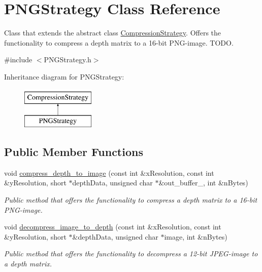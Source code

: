 \hypertarget{class_p_n_g_strategy}{\section{P\+N\+G\+Strategy Class Reference}
\label{class_p_n_g_strategy}
}


Class that extends the abstract class \hyperlink{class_compression_strategy}{Compression\+Strategy}. Offers the functionality to compress a depth matrix to a 16-\/bit P\+N\+G-\/image. T\+O\+D\+O.  




{\ttfamily \#include $<$P\+N\+G\+Strategy.\+h$>$}

Inheritance diagram for P\+N\+G\+Strategy\+:\begin{figure}[H]
\begin{center}
\leavevmode
\includegraphics[height=2.000000cm]{class_p_n_g_strategy}
\end{center}
\end{figure}
\subsection*{Public Member Functions}
\begin{DoxyCompactItemize}
\item 
void \hyperlink{class_p_n_g_strategy_aaa542a51c70ede4b82facb66d9ff9ec2}{compress\+\_\+depth\+\_\+to\+\_\+image} (const int \&x\+Resolution, const int \&y\+Resolution, short $\ast$depth\+Data, unsigned char $\ast$\&out\+\_\+buffer\+\_\+, int \&n\+Bytes)
\begin{DoxyCompactList}\small\item\em Public method that offers the functionality to compress a depth matrix to a 16-\/bit P\+N\+G-\/image. \end{DoxyCompactList}\item 
void \hyperlink{class_p_n_g_strategy_a170b89ef5e216f9166d80916d3efe1b0}{decompress\+\_\+image\+\_\+to\+\_\+depth} (const int \&x\+Resolution, const int \&y\+Resolution, short $\ast$\&depth\+Data, unsigned char $\ast$image, int \&n\+Bytes)
\begin{DoxyCompactList}\small\item\em Public method that offers the functionality to decompress a 12-\/bit J\+P\+E\+G-\/image to a depth matrix. \end{DoxyCompactList}\end{DoxyCompactItemize}


